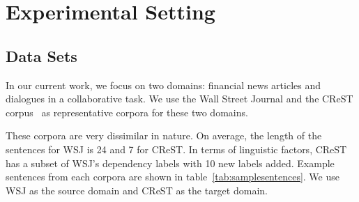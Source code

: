 
\section{Experimental Setting} \label{sec:exptsetup}


\subsection{Data Sets}
In our current work, we focus on two domains: financial news articles and dialogues in a collaborative task.
We use the Wall Street Journal \cite{Marcus:1994:PTA:1075812.1075835} and the CReST corpus~\cite{eberhard2010indiana} as representative corpora for these two domains. %

These corpora are very dissimilar in nature. On  average, the length of the sentences for WSJ is 24 and 7 for CReST. In terms of linguistic factors, CReST has a subset of WSJ's dependency labels with 10 new labels added.%
Example sentences from each corpora are shown in table~\ref{tab:samplesentences}. We use WSJ as the source domain and CReST as the target domain.  %

